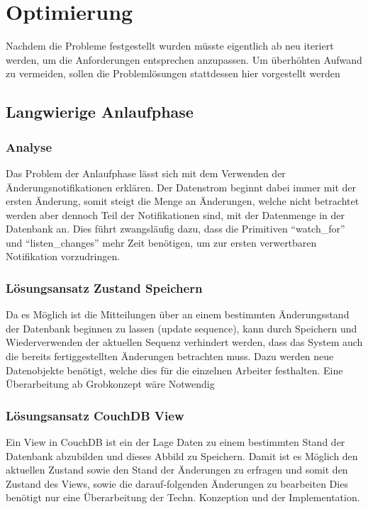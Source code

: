 \chapter{Optimierung}

Nachdem die Probleme festgestellt wurden
müsste eigentlich ab  neu iteriert werden,
um die Anforderungen entsprechen anzupassen.
Um überhöhten Aufwand zu vermeiden,
sollen die Problemlösungen stattdessen hier vorgestellt werden 

\section{Langwierige Anlaufphase}
\subsection{Analyse}
Das Problem der Anlaufphase lässt sich mit dem Verwenden der Änderungsnotifikationen erklären. Der Datenstrom beginnt dabei immer mit der ersten Änderung,
somit steigt die Menge an Änderungen, welche nicht betrachtet werden aber dennoch Teil der Notifikationen sind, mit der Datenmenge in der Datenbank an.
Dies führt zwangsläufig dazu, dass die Primitiven ``watch\_for'' und ``listen\_changes'' mehr Zeit benötigen, um zur ersten verwertbaren Notifikation vorzudringen.


\subsection{Lösungsansatz Zustand Speichern}
Da es Möglich ist die Mitteilungen über an einem bestimmten Änderungsstand der 
Datenbank beginnen zu lassen (update sequence),
kann durch Speichern und Wiederverwenden der aktuellen Sequenz verhindert werden,
dass das System auch die bereits fertiggestellten Änderungen betrachten muss.
Dazu werden neue Datenobjekte benötigt, welche dies für die einzelnen Arbeiter festhalten. Eine Überarbeitung ab Grobkonzept wäre Notwendig


\subsection{Lösungsansatz CouchDB View}
Ein View in CouchDB ist ein der Lage Daten zu einem bestimmten Stand der Datenbank abzubilden und dieses Abbild zu Speichern.
Damit ist es Möglich den aktuellen Zustand sowie den Stand der Änderungen zu erfragen und somit den Zustand des Views, sowie die darauf-folgenden Änderungen zu bearbeiten 
Dies benötigt nur eine Überarbeitung der Techn. Konzeption und der Implementation.

